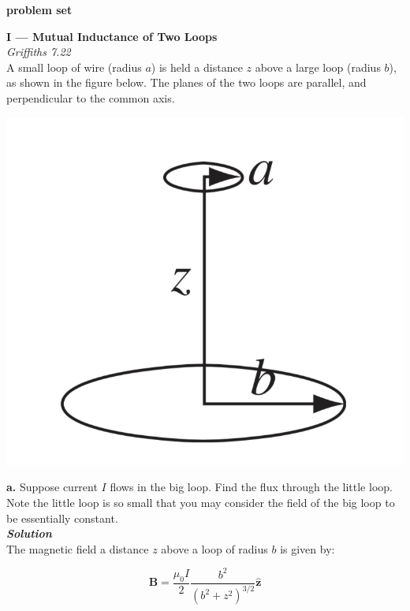 \documentclass[14pt]{extarticle}
\renewcommand{\v}[1]{{\bm #1}}
\newcommand{\hv}[1]{\hat{\bm{#1}}}
\newcommand{\bfit}[1]{\textbf{\textit{#1}}}
\newcommand{\muo}{\mu_0}
\begin{document}
\setlength{\parindent}{0pt}

{\LARGE \bf problem set} 

\noindent \hrulefill

\hfill

\hfill

{\bf \large I --- Mutual Inductance of Two Loops} \\

{\it Griffiths 7.22} \\ 

A small loop of wire (radius $a$) is held a distance $z$ above a large loop (radius $b$), as shown in the figure below. The planes of the two loops are parallel, and perpendicular to the common axis.    

\begin{center}
	\includegraphics[scale=0.2]{ps8-pic1.png}
\end{center}

{\bf \Large a.} Suppose current $I$ flows in the big loop.  Find the flux through the little loop.  Note the little loop is so small that you may consider the field of the big loop to be essentially constant. \\ 

{\bfit{Solution}} \\ 

The magnetic field a distance $z$ above a loop of radius $b$ is given by:

$$\v B = \frac{\muo I}{2} \frac{b^2}{(b^2+z^2)^{3/2}} \hv z$$ \ 
\end{document}
